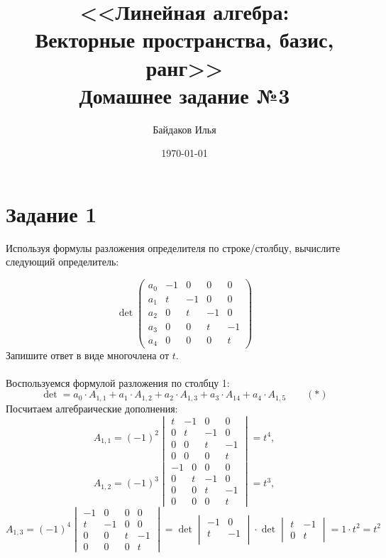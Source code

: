 \documentclass[a4paper,12pt]{article}
\begin{document}
\title{<<Линейная алгебра:\\ Векторные пространства, базис, ранг>>\\ \vspace{12pt} Домашнее задание №3}
\author{Байдаков Илья}
\date{\today}
\maketitle

\section*{Задание 1}
Используя формулы разложения определителя по строке/столбцу, вычислите следующий определитель:

$$
\det\begin{pmatrix}
a_0&-1&0&0&0\\
a_1&t&-1&0&0\\
a_2&0&t&-1&0\\
a_3&0&0&t&-1\\
a_4&0&0&0&t
\end{pmatrix}
$$
Запишите ответ в виде многочлена от $t$.
\vspace{5pt} \\
 \\ Воспользуемся формулой разложения по столбцу 1:
$$\det=a_0 \cdot A_{1,1}+a_1 \cdot A_{1,2}+a_2 \cdot A_{1,3}+a_3 \cdot A_{14}+a_4 \cdot A_{1,5} \qquad (*)$$
Посчитаем алгебраические дополнения:
$$A_{1,1}=(-1)^{2}
\begin{vmatrix}
t&-1&0&0\\
0&t&-1&0\\
0&0&t&-1\\
0&0&0&t
\end{vmatrix}
=t^4,$$
$$A_{1,2}=(-1)^{3}
\begin{vmatrix}
-1&0&0&0\\
0&t&-1&0\\
0&0&t&-1\\
0&0&0&t
\end{vmatrix}
=t^3,$$
$$A_{1,3}=(-1)^{4}
\begin{vmatrix}
-1&0&0&0\\
t&-1&0&0\\
0&0&t&-1\\
0&0&0&t
\end{vmatrix}
= \det 
\begin{vmatrix}
-1&0\\
t&-1\\
\end{vmatrix}
\cdot 
\det 
\begin{vmatrix}
t&-1\\
0&t
\end{vmatrix}
=1 \cdot t^2 = t^2$$
\end{document}
